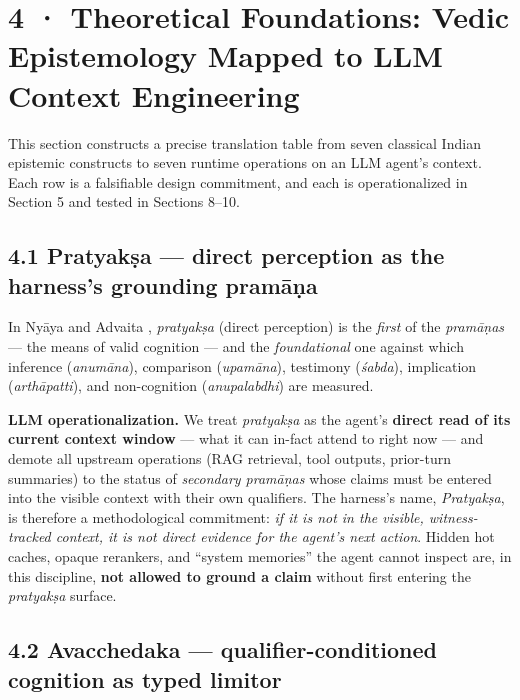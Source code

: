 \section{4 · Theoretical Foundations: Vedic Epistemology Mapped to LLM Context Engineering}\label{theoretical-foundations-vedic-epistemology-mapped-to-llm-context-engineering}

This section constructs a precise translation table from seven classical Indian epistemic constructs to seven runtime operations on an LLM agent's context. Each row is a falsifiable design commitment, and each is operationalized in Section 5 and tested in Sections 8--10.

\subsection{4.1 Pratyakṣa --- direct perception as the harness's grounding pramāṇa}\label{pratyakux1e63a-direct-perception-as-the-harnesss-grounding-pramux101ux1e47a}

In Nyāya \citep{aksapada200nyayasutra, matilal1986perception, phillips2012epistemology} and Advaita \citep{dharmaraja17vedantaparibhasa, datta1932advaita}, \emph{pratyakṣa} (direct perception) is the \emph{first} of the \emph{pramāṇas} --- the means of valid cognition --- and the \emph{foundational} one against which inference (\emph{anumāna}), comparison (\emph{upamāna}), testimony (\emph{śabda}), implication (\emph{arthāpatti}), and non-cognition (\emph{anupalabdhi}) are measured.

\textbf{LLM operationalization.} We treat \emph{pratyakṣa} as the agent's \textbf{direct read of its current context window} --- what it can in-fact attend to right now --- and demote all upstream operations (RAG retrieval, tool outputs, prior-turn summaries) to the status of \emph{secondary pramāṇas} whose claims must be entered into the visible context with their own qualifiers. The harness's name, \emph{Pratyakṣa}, is therefore a methodological commitment: \emph{if it is not in the visible, witness-tracked context, it is not direct evidence for the agent's next action}. Hidden hot caches, opaque rerankers, and ``system memories'' the agent cannot inspect are, in this discipline, \textbf{not allowed to ground a claim} without first entering the \emph{pratyakṣa} surface.

\subsection{4.2 Avacchedaka --- qualifier-conditioned cognition as typed limitor}\label{avacchedaka-qualifier-conditioned-cognition-as-typed-limitor}

